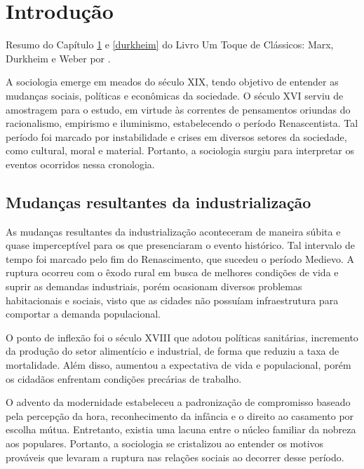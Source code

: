\section{Introdução}\label{intro}

Resumo do Capítulo \ref{intro} e \ref{durkheim} do Livro Um Toque de Clássicos: Marx, Durkheim e Weber por .


A sociologia emerge em meados do século XIX, tendo objetivo de entender as mudanças sociais, políticas e econômicas da sociedade.
O século XVI serviu de amostragem para o estudo, em virtude às correntes de pensamentos oriundas do racionalismo, empirismo e iluminismo, estabelecendo o período Renascentista.
Tal período foi marcado por instabilidade e crises em diversos setores da sociedade, como cultural, moral e material.
Portanto, a sociologia surgiu para interpretar os eventos ocorridos nessa cronologia.



\subsection{Mudanças resultantes da industrialização}

As mudanças resultantes da industrialização aconteceram de maneira súbita e quase imperceptível para os que presenciaram o evento histórico.
Tal intervalo de tempo foi marcado pelo fim do Renascimento, que sucedeu o período Medievo.
A ruptura ocorreu com o êxodo rural em busca de melhores condições de vida e suprir as demandas industriais, porém ocasionam diversos problemas habitacionais e sociais, visto que as cidades não possuíam infraestrutura para comportar a demanda populacional.

O ponto de inflexão foi o século XVIII que adotou políticas sanitárias, incremento da produção do setor alimentício e industrial, de forma que reduziu a taxa de mortalidade. 
Além disso, aumentou a expectativa de vida e populacional, porém os cidadãos enfrentam condições precárias de trabalho.

O advento da modernidade estabeleceu a padronização de compromisso baseado pela percepção da hora, reconhecimento da infância e o direito ao casamento por escolha mútua.
Entretanto, existia uma lacuna entre o núcleo familiar da nobreza aos populares.
Portanto, a sociologia se cristalizou ao entender os motivos prováveis que levaram a ruptura nas relações sociais ao decorrer desse período.



